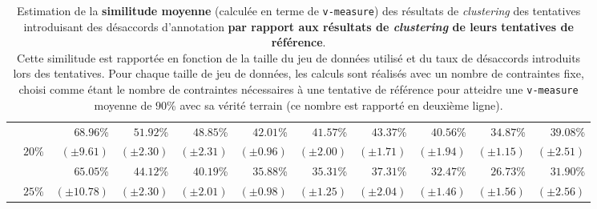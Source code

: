\begin{table}[!htb]
\begin{center}
{\begin{tabular}{|c|c|r|r|r|r|r|r|r|r|r|}
						\cellcolor{colorTableHeader!15}
							& \cellcolor{colorTableHeader!15}
							& $68.96$\%
							& $51.92$\%
							& $48.85$\%
							& $42.01$\%
							& $41.57$\%
							& $43.37$\%
							& $40.56$\%
							& $34.87$\%
							& $39.08$\%
							\tabularnewline
						\cellcolor{colorTableHeader!15}
							& \multirow{-2}{*}{
								\cellcolor{colorTableHeader!15}
								$20$\%
							}
							& \footnotesize $(\pm9.61)$
							& \footnotesize $(\pm2.30)$
							& \footnotesize $(\pm2.31)$
							& \footnotesize $(\pm0.96)$
							& \footnotesize $(\pm2.00)$
							& \footnotesize $(\pm1.71)$
							& \footnotesize $(\pm1.94)$
							& \footnotesize $(\pm1.15)$
							& \footnotesize $(\pm2.51)$
							\tabularnewline
							\hhline{~----------}
						
						\cellcolor{colorTableHeader!15}
							& \cellcolor{colorTableHeader!15}
							& $65.05$\%
							& $44.12$\%
							& $40.19$\%
							& $35.88$\%
							& $35.31$\%
							& $37.31$\%
							& $32.47$\%
							& $26.73$\%
							& $31.90$\%
							\tabularnewline
						\multirow{-12}{*}{
							\cellcolor{colorTableHeader!15}
							\rotatebox[origin=c]{90}{Taux de désaccords simulés}
						}
							& \multirow{-2}{*}{
								\cellcolor{colorTableHeader!15}
								$25$\%
							}
							& \footnotesize $(\pm10.78)$
							& \footnotesize $(\pm2.30)$
							& \footnotesize $(\pm2.01)$
							& \footnotesize $(\pm0.98)$
							& \footnotesize $(\pm1.25)$
							& \footnotesize $(\pm2.04)$
							& \footnotesize $(\pm1.46)$
							& \footnotesize $(\pm1.56)$
							& \footnotesize $(\pm2.56)$
							\tabularnewline
							\hline
						
					\end{tabular}
				}
				\end{center}
				\caption{
					Estimation de la \textbf{similitude moyenne} (calculée en terme de \texttt{v-measure}) des résultats de \textit{clustering} des tentatives introduisant des désaccords d'annotation \textbf{par rapport aux résultats de \textit{clustering} de leurs tentatives de référence}. \\
					Cette similitude est rapportée en fonction de la taille du jeu de données utilisé et du taux de désaccords introduits lors des tentatives.
					Pour chaque taille de jeu de données, les calculs sont réalisés avec un nombre de contraintes fixe, choisi comme étant le nombre de contraintes nécessaires à une tentative de référence pour atteidre une \texttt{v-measure} moyenne de $90$\% avec sa vérité terrain (ce nombre est rapporté en deuxième ligne).
				}
				\label{table:4.6.2-ETUDE-ROBUSTESSE-SUBJECTIVITE-ANNOTATION-ET-DIVERGENCE-CLUSTERING}
			\end{table}

